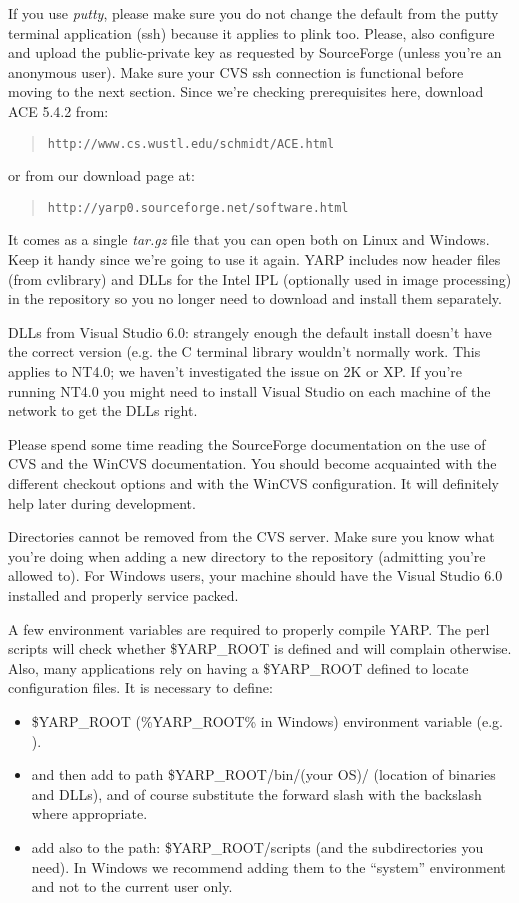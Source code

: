 If you use {\em putty}, please make sure you do not change the default from the putty terminal application (ssh)
because it applies to plink too. Please, also configure and upload the public-private key as requested by SourceForge (unless you're an anonymous user). Make sure your CVS ssh connection is functional before moving to the next section. Since we're checking prerequisites here, download ACE 5.4.2 from:

\begin{quote}
{\tt http://www.cs.wustl.edu/schmidt/ACE.html}
\end{quote}

or from our download page at:
\begin{quote}
{\tt http://yarp0.sourceforge.net/software.html}
\end{quote}

It comes as a single {\em tar.gz} file that you can open both on Linux and Windows. Keep it handy since we're going to use it again. YARP includes now header files (from cvlibrary) and DLLs for the Intel IPL (optionally used in image processing) in the repository so you no longer need to download and install them separately.

DLLs from Visual Studio 6.0: strangely enough the default install doesn't have the
correct version (e.g. the C terminal library wouldn't normally work. This applies to
NT4.0; we haven't investigated the issue on 2K or XP. If you're running NT4.0 you might
need to install Visual Studio on each machine of the network to get the DLLs right.

Please spend some time reading the SourceForge documentation on the use of CVS and
the WinCVS documentation. You should become acquainted with the different checkout
options and with the WinCVS configuration. It will definitely help later during
development.

Directories cannot be removed from the CVS server. Make sure you know what
you're doing when adding a new directory to the repository (admitting you're allowed to).
For Windows users, your machine should have the Visual Studio 6.0 installed and properly
service packed.

A few environment variables are required to properly compile YARP. The perl scripts will check whether \$YARP\_ROOT is defined and will complain otherwise. Also, many applications rely on having a \$YARP\_ROOT defined to locate configuration files. It is necessary to define:
\begin{itemize}
\item \$YARP\_ROOT (\%YARP\_ROOT\% in Windows) environment variable (e.g. ).
\item and then add to path \$YARP\_ROOT/bin/(your OS)/ (location of binaries and DLLs), and of course substitute the forward slash with the backslash where appropriate.
\item add also to the path: \$YARP\_ROOT/scripts (and the subdirectories you need). In Windows we recommend adding them to the ``system'' environment and not to the current user only.
\end{itemize}

